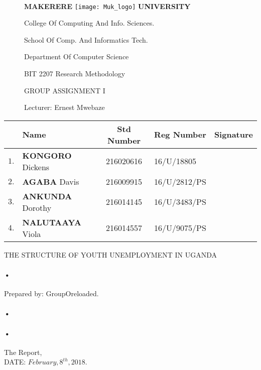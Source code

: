 \documentclass[11pt]{article}
\begin{document}
\begin{figure}        
\paragraph{} 
 \begin{center}
 \huge \textbf{MAKERERE} \texttt{[image: Muk\_logo]}  \huge \textbf{UNIVERSITY}
 \end{center}
\begin{center}
\huge  College Of Computing And Info. Sciences.
\end{center}
\begin{center}
\huge School Of Comp. And Informatics Tech.
\end{center}
\begin{center}
\huge Department Of Computer Science
\end{center}
\begin{center}
\huge BIT 2207 Research Methodology
\end{center}
\begin{center}
\huge GROUP ASSIGNMENT I\\
\end{center} 
\huge Lecturer: Ernest Mwebaze 
\end{figure}
\begin{tabular}{|c|l|c|l|c|}
\hline
& \textbf{Name} & \textbf{Std Number} & \textbf{Reg Number} & \textbf{Signature} \\ \hline
$1.$& \textbf{KONGORO} Dickens & 216020616 & {16/U/18805} &\ \\ \hline
$2.$& \textbf{AGABA} Davis & 216009915 & {16/U/2812/PS} &\\ \hline
$3.$& \textbf{ANKUNDA} Dorothy & 216014145 & {16/U/3483/PS} &\\ \hline
$4.$& \textbf{NALUTAAYA} Viola & 216014557 & {16/U/9075/PS} &\\ \hline

\end{tabular} 


\begin{titlepage}
\centerline{THE STRUCTURE OF YOUTH UNEMPLOYMENT IN UGANDA\\}
\paragraph*{•}
\centerline{  Prepared by:  GroupOreloaded.\\}
\paragraph*{•}
\paragraph*{•}
  \begin{flushright}
  The Report,\\
  DATE: $February,8^{th},2018$.
  \end{flushright}
\date{\today}
\end{titlepage}
\tableofcontents
\newpage
\end{document}
